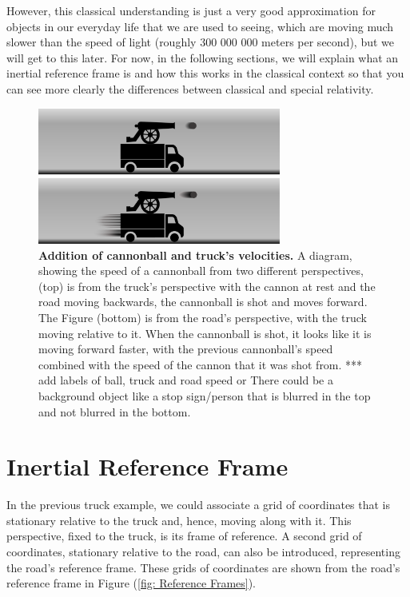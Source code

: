 However, this classical understanding is just a very good approximation for objects in our everyday life that we are used to seeing, which are moving much slower than the speed of light (roughly 300 000 000 meters per second), but we will get to this later.
For now, in the following sections, we will explain what an inertial reference frame is and how this works in the classical context so that you can see more clearly the differences between classical and special relativity.

\begin{figure}[H]
	\centering
	\includegraphics[width = 8cm]{images/pdf/lorry_cannonball.pdf}
	\caption{\textbf{Addition of cannonball and truck's velocities.} A diagram, showing the speed of a cannonball from two different perspectives, (top) is from the truck's perspective with the cannon at rest and the road moving backwards, the cannonball is shot and moves forward. The Figure (bottom) is from the road's perspective, with the truck moving relative to it. When the cannonball is shot, it looks like it is moving forward faster, with the previous cannonball's speed combined with the speed of the cannon that it was shot from. *** add labels of ball, truck and road speed or There could be a background object like a stop sign/person that is blurred in the top and not blurred in the bottom.}
	\label{fig: truck cannonball}
\end{figure}

\section{Inertial Reference Frame} \label{sect: Inertial Reference Frame}

In the previous truck example, we could associate a grid of coordinates that is stationary relative to the truck and, hence, moving along with it.
This perspective, fixed to the truck, is its frame of reference.
A second grid of coordinates, stationary relative to the road, can also be introduced, representing the road's reference frame.
These grids of coordinates are shown from the road's reference frame in Figure (\ref{fig: Reference Frames}).

